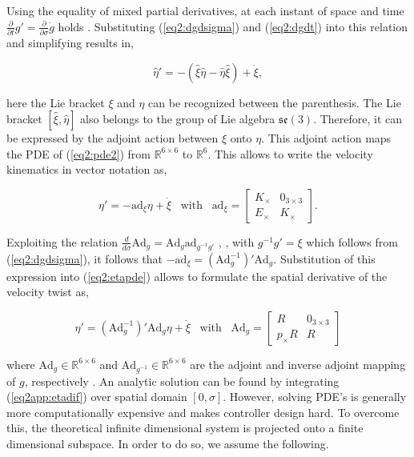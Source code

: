 Using the equality of mixed partial derivatives, at each instant of space and time $\frac{\partial}{\partial t}g' = \frac{\partial}{\partial \sigma}\dot{g}$ holds \cite{Caasenbrood2020}. Substituting (\ref{eq2:dgdsigma}) and (\ref{eq2:dgdt}) into this relation and simplifying results in,

\begin{equation}
    \hat{\eta}' = -(\hat{\xi}\hat{\eta} - \hat{\eta}\hat{\xi}) + \Dot{\xi},
        \label{eq2:pde2}
\end{equation}

here the Lie bracket $\xi$ and $\eta$ can be recognized between the parenthesis. The Lie bracket $[\hat{\xi},\hat{\eta}]$ also belongs to the group of Lie algebra $\mathfrak{se}(3)$. Therefore, it can be expressed by the adjoint action between $\xi$ onto $\eta$. This adjoint action maps the PDE of (\ref{eq2:pde2}) from $\mathbb{R}^{6\times 6}$ to $\mathbb{R}^6$. This allows to write the velocity kinematics in vector notation as,

\begin{equation}
    \eta'= -\text{ad}_\xi \eta + \Dot{\xi} \hspace{10pt} \text{with} \hspace{10pt} \text{ad}_{\xi} = \begin{bmatrix} K_\times & 0_{3\times 3} \\ E_\times & K_\times \end{bmatrix}.
    \label{eq2:etapde}
\end{equation}


Exploiting the relation $\frac{d}{d \sigma} \text{Ad}_g = \text{Ad}_g \text{ad}_{g^{-1}g'}$ \cite{Boyer2019}, \cite{traversaro2016multibody} , with $g^{-1}g' = \xi$ which follows from (\ref{eq2:dgdsigma}), it follows that $-\text{ad}_\xi = (\text{Ad}_g^{-1})'\text{Ad}_g$. Substitution of this expression into (\ref{eq2:etapde}) allows to formulate the spatial derivative of the velocity twist as,

\begin{equation}
    \eta'= (\text{Ad}_g^{-1})'\text{Ad}_g \eta + \Dot{\xi} \hspace{10pt} \text{with} \hspace{10pt} \text{Ad}_g = \begin{bmatrix} R & 0_{3\times 3} \\ p_\times R & R \end{bmatrix}
    \label{eq2app:etadif}
\end{equation}

where $\text{Ad}_g \in \mathbb{R}^{6 \times 6}$ and $\text{Ad}_{g^{-1}}  \in \mathbb{R}^{6 \times 6}$ are the adjoint and inverse adjoint mapping of $g$, respectively \cite{Sola2018}. An analytic solution can be found by integrating (\ref{eq2app:etadif}) over spatial domain $[0,\sigma]$. However, solving PDE's is generally more computationally expensive and makes controller design hard.
To overcome this, the theoretical infinite dimensional system is projected onto a finite dimensional subspace. In order to do so, we assume the following.
